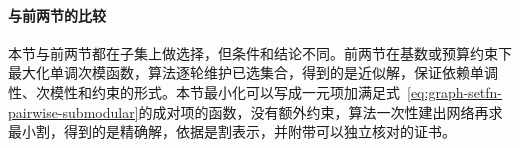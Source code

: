 \paragraph{与前两节的比较}
本节与前两节都在子集上做选择，但条件和结论不同。前两节在基数或预算约束下最大化单调次模函数，算法逐轮维护已选集合，得到的是近似解，保证依赖单调性、次模性和约束的形式。本节最小化可以写成一元项加满足式~\eqref{eq:graph-setfn-pairwise-submodular}的成对项的函数，没有额外约束，算法一次性建出网络再求最小割，得到的是精确解，依据是割表示，并附带可以独立核对的证书。
